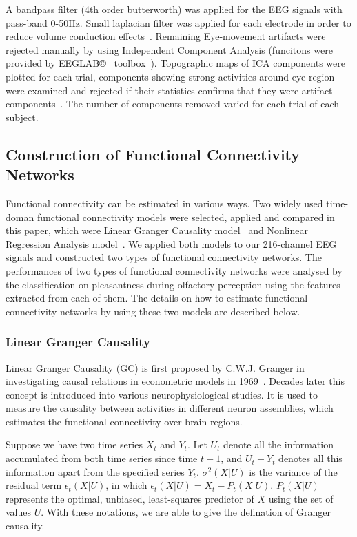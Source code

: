 A bandpass filter (4th order butterworth) was applied for the EEG signals with pass-band 0-50Hz. Small laplacian filter was applied for each electrode in order to reduce volume conduction effects~\cite{wolters2007volume}. Remaining Eye-movement artifacts were rejected manually by using Independent Component Analysis (funcitons were provided by EEGLAB\copyright~ toolbox~\cite{luck2014introduction}). Topographic maps of ICA components were plotted for each trial, components showing strong activities around eye-region were examined and rejected if their statistics confirms that they were artifact components~\cite{luck2014introduction}. The number of components removed varied for each trial of each subject. 

\subsection{Construction of Functional Connectivity Networks}
Functional connectivity can be estimated in various ways. Two widely used time-doman functional connectivity models were selected, applied and compared in this paper, which were Linear Granger Causality model~\cite{roebroeck2005mapping}  and Nonlinear Regression Analysis model~\cite{bettus2008enhanced}. We applied both models to our 216-channel EEG signals and constructed two types of functional connectivity networks. The performances of two types of functional connectivity networks were analysed by the classification on pleasantness during olfactory perception using the features extracted from each of them. The details on how to estimate functional connectivity networks by using these two models are described below.

\subsubsection{Linear Granger Causality}
Linear Granger Causality (GC) is first proposed by C.W.J. Granger in investigating causal relations in econometric models in 1969~\cite{granger1969investigating}. Decades later this concept is introduced into various neurophysiological studies. It is used to measure the causality between activities in different neuron assemblies, which estimates the functional connectivity over brain regions. 

Suppose we have two time series $X_t$ and $Y_t$. Let $U_t$ denote all the information accumulated from both time series since time $t-1$, and $U_t-Y_t$ denotes all this information apart from the specified series $Y_t$. $\sigma^2(X|U)$ is the variance of the residual term $\epsilon_t(X|U)$, in which $\epsilon_t(X|U)=X_t-P_t(X|U)$. $P_t(X|U)$ represents the optimal, unbiased, least-squares predictor of $X$ using the set of values $U$. With these notations, we are able to give the defination of Granger causality.

